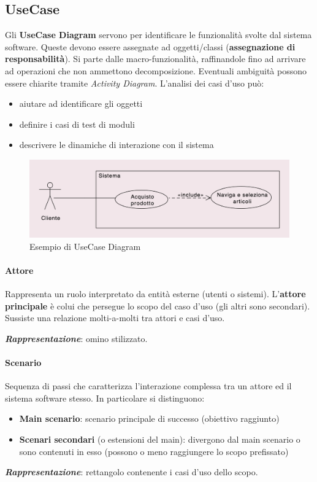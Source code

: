 \subsection{UseCase}

Gli \textbf{UseCase Diagram} servono per identificare le funzionalità svolte dal sistema software. Queste devono essere assegnate ad oggetti/classi (\textbf{assegnazione di responsabilità}). Si parte dalle macro-funzionalità, raffinandole fino ad arrivare ad operazioni che non ammettono decomposizione. Eventuali ambiguità possono essere chiarite tramite \textit{Activity Diagram}. L'analisi dei casi d'uso può:
\begin{itemize}
    \item aiutare ad identificare gli oggetti
    \item definire i casi di test di moduli
    \item descrivere le dinamiche di interazione con il sistema
\end{itemize}

\begin{figure}[h!]
    \centering
    \includegraphics[width=0.75\linewidth]{assets/UML/use-case/use-case1.png}
    \caption{Esempio di UseCase Diagram}
    \label{fig:use-case1}
\end{figure}

\paragraph{Attore} Rappresenta un ruolo interpretato da entità esterne (utenti o sistemi). L'\textbf{attore principale} è colui che persegue lo scopo del caso d'uso (gli altri sono secondari). Sussiste una relazione molti-a-molti tra attori e casi d'uso.

\textbf{\textit{Rappresentazione}}: omino stilizzato.

\paragraph{Scenario} Sequenza di passi che caratterizza l'interazione complessa tra un attore ed il sistema software stesso. In particolare si distinguono:
\begin{itemize}
    \item \textbf{Main scenario}: scenario principale di successo (obiettivo raggiunto)
    \item \textbf{Scenari secondari} (o estensioni del main): divergono dal main scenario o sono contenuti in esso (possono o meno raggiungere lo scopo prefissato)
\end{itemize}
\textbf{\textit{Rappresentazione}}: rettangolo contenente i casi d'uso dello scopo.

